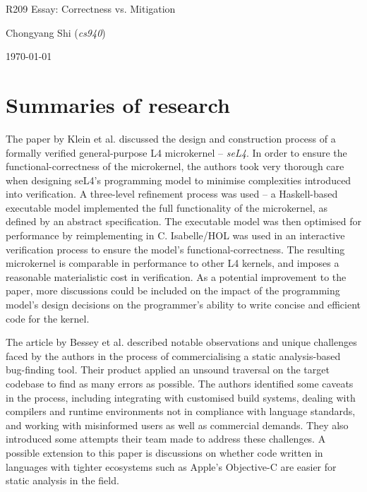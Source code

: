 \documentclass[11pt]{article}
\begin{document}
\centerline{\Large R209 Essay:  Correctness vs. Mitigation}
\vspace{2em}
\centerline{\large Chongyang Shi (\emph{cs940})}
\vspace{1em}
\centerline{\large \today}
\vspace{1em}

\section{Summaries of research}

The paper by Klein et al. \cite{klein2009sel4} discussed the design and construction process of a formally verified general-purpose L4 microkernel -- \emph{seL4}. In order to ensure the functional-correctness of the microkernel, the authors took very thorough care when designing seL4's programming model to minimise complexities introduced into verification. A three-level refinement process was used -- a Haskell-based executable model implemented the full functionality of the microkernel, as defined by an abstract specification. The executable model was then optimised for performance by reimplementing in C. Isabelle/HOL was used in an interactive verification process to ensure the model's functional-correctness. The resulting microkernel is comparable in performance to other L4 kernels, and imposes a reasonable materialistic cost in verification. As a potential improvement to the paper, more discussions could be included on the impact of the programming model's design decisions on the programmer's ability to write concise and efficient code for the kernel.

The article by Bessey et al. \cite{bessey2010few} described notable observations and unique challenges faced by the authors in the process of commercialising a static analysis-based bug-finding tool. Their product applied an unsound traversal on the target codebase to find as many errors as possible. The authors identified some caveats in the process, including integrating with customised build systems, dealing with compilers and runtime environments not in compliance with language standards, and working with misinformed users as well as commercial demands. They also introduced some attempts their team made to address these challenges. A possible extension to this paper is discussions on whether code written in languages with tighter ecosystems such as Apple's Objective-C are easier for static analysis in the field.
\end{document}
